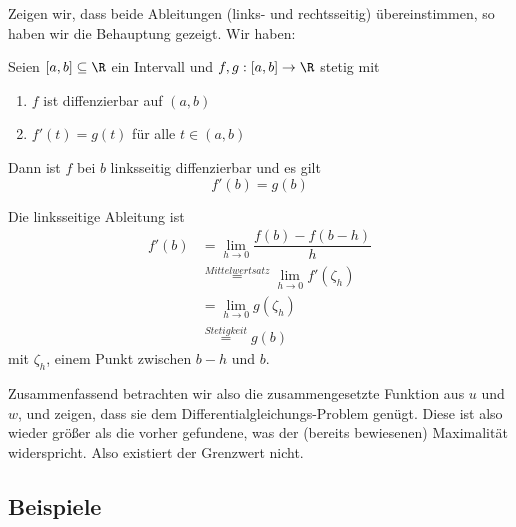 \documentclass[main.tex]{subfiles}
\begin{document}
\begin{Beweis}
  Zeigen wir, dass beide Ableitungen (links- und rechtsseitig) übereinstimmen, so haben wir die Behauptung gezeigt. Wir haben:
  \begin{Lemma}
    Seien $[a,b] \subseteq \R$ ein Intervall und $f,g : [a,b] \to \R$ stetig mit
    \begin{enumerate}
      \item $f$ ist diffenzierbar auf $(a,b)$
      \item $f'(t) = g(t)$ für alle $t \in (a,b)$
    \end{enumerate}
    Dann ist $f$ bei $b$ linksseitig diffenzierbar und es gilt
    $$f'(b) = g(b)$$
  \end{Lemma}
  \begin{Beweis}[Übung 15.35]
    Die linksseitige Ableitung ist
    $$\begin{aligned}
      f'(b) & = \lim \limits_{h \to 0} \dfrac{f(b) - f(b - h)}{h} \\
      & \stackrel{\scriptscriptstyle Mittelwertsatz}{=} \lim \limits_{h \to 0} f'(\zeta_h) \\
      & = \lim \limits_{h \to 0} g(\zeta_h) \\
      & \stackrel{\scriptscriptstyle Stetigkeit}{=} g(b)
    \end{aligned}$$
    mit $\zeta_h$, einem Punkt zwischen $b-h$ und $b$.
  \end{Beweis}
  Zusammenfassend betrachten wir also die zusammengesetzte Funktion aus $u$ und $w$, und zeigen, dass sie dem Differentialgleichungs-Problem genügt. Diese ist also wieder größer als die vorher gefundene, was der (bereits bewiesenen) Maximalität widerspricht. Also existiert der Grenzwert nicht.
\end{Beweis}

\subsection{Beispiele}
\end{document}
